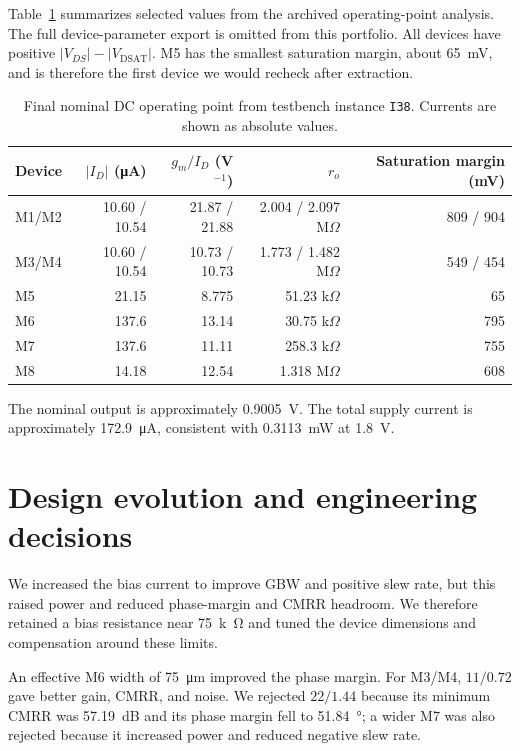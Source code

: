 Table~\ref{tab:op-point} summarizes selected values from the archived operating-point analysis. The full device-parameter export is omitted from this portfolio. All devices have positive $\lvert V_{DS}\rvert-\lvert V_{\mathrm{DSAT}}\rvert$. M5 has the smallest saturation margin, about \SI{65}{mV}, and is therefore the first device we would recheck after extraction.

\begin{table}[htbp]
\centering
\caption{Final nominal DC operating point from testbench instance \texttt{I38}. Currents are shown as absolute values.}
\label{tab:op-point}
\small
\begin{tabular}{@{}lrrrr@{}}
\toprule
Device & $\lvert I_D\rvert$ (\si{\micro A}) & $g_m/I_D$ (V$^{-1}$) & $r_o$ & Saturation margin (mV) \\
\midrule
M1/M2 & 10.60 / 10.54 & 21.87 / 21.88 & 2.004 / 2.097 M$\Omega$ & 809 / 904 \\
M3/M4 & 10.60 / 10.54 & 10.73 / 10.73 & 1.773 / 1.482 M$\Omega$ & 549 / 454 \\
M5 & 21.15 & 8.775 & 51.23 k$\Omega$ & 65 \\
M6 & 137.6 & 13.14 & 30.75 k$\Omega$ & 795 \\
M7 & 137.6 & 11.11 & 258.3 k$\Omega$ & 755 \\
M8 & 14.18 & 12.54 & 1.318 M$\Omega$ & 608 \\
\bottomrule
\end{tabular}
\end{table}

The nominal output is approximately \SI{0.9005}{V}. The total supply current is approximately \SI{172.9}{\micro A}, consistent with \SI{0.3113}{mW} at \SI{1.8}{V}.

\section{Design evolution and engineering decisions}

We increased the bias current to improve GBW and positive slew rate, but this raised power and reduced phase-margin and CMRR headroom. We therefore retained a bias resistance near \SI{75}{k\ohm} and tuned the device dimensions and compensation around these limits.

An effective M6 width of \SI{75}{\micro m} improved the phase margin. For M3/M4, $11/0.72$ gave better gain, CMRR, and noise. We rejected $22/1.44$ because its minimum CMRR was \SI{57.19}{dB} and its phase margin fell to \SI{51.84}{\degree}; a wider M7 was also rejected because it increased power and reduced negative slew rate.

